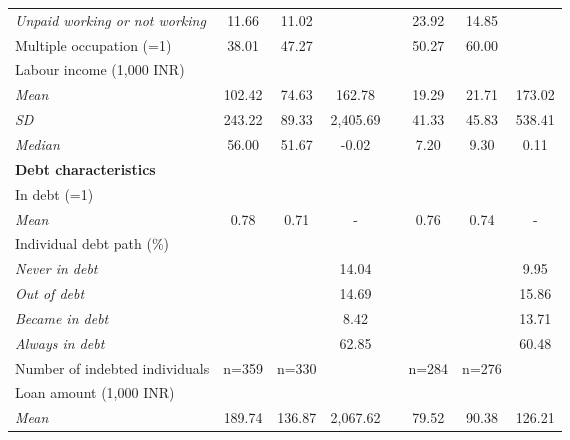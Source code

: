 \begin{table}[htbp]
{\begin{tabular}{lccccccc}
    \hspace*{0.1cm} \textit{Unpaid working or not working} & 11.66 & 11.02 &       &       & 23.92 & 14.85 &  \\
    Multiple occupation (=1) & 38.01 & 47.27 &       &       & 50.27 & 60.00 &  \\
    Labour income (1,000 INR) &       &       &       &       &       &       &  \\
    \hspace*{0.1cm} \textit{Mean} & 102.42 & 74.63 & 162.78 &       & 19.29 & 21.71 & 173.02 \\
    \hspace*{0.1cm} \textit{SD} & 243.22 & 89.33 & 2,405.69 &       & 41.33 & 45.83 & 538.41 \\
    \hspace*{0.1cm} \textit{Median} & 56.00 & 51.67 & -0.02 &       & 7.20  & 9.30  & 0.11 \\
    \textbf{Debt characteristics} &       &       &       &       &       &       &  \\
    In debt (=1) &       &       &       &       &       &       &  \\
    \hspace*{0.1cm} \textit{Mean} & 0.78  & 0.71  & -     &       & 0.76  & 0.74  & - \\
    Individual debt path (\%) &       &       &       &       &       &       &  \\
    \hspace*{0.1cm} \textit{Never in debt} &       &       & 14.04 &       &       &       & 9.95 \\
    \hspace*{0.1cm} \textit{Out of debt} &       &       & 14.69 &       &       &       & 15.86 \\
    \hspace*{0.1cm} \textit{Became in debt} &       &       & 8.42  &       &       &       & 13.71 \\
    \hspace*{0.1cm} \textit{Always in debt} &       &       & 62.85 &       &       &       & 60.48 \\
    Number of indebted individuals & n=359 & n=330 &       &       & n=284 & n=276 &  \\
    Loan amount (1,000 INR) &       &       &       &       &       &       &  \\
    \hspace*{0.1cm} \textit{Mean} & 189.74 & 136.87 & 2,067.62 &       & 79.52 & 90.38 & 126.21 \\

\end{tabular}}
\end{table}
